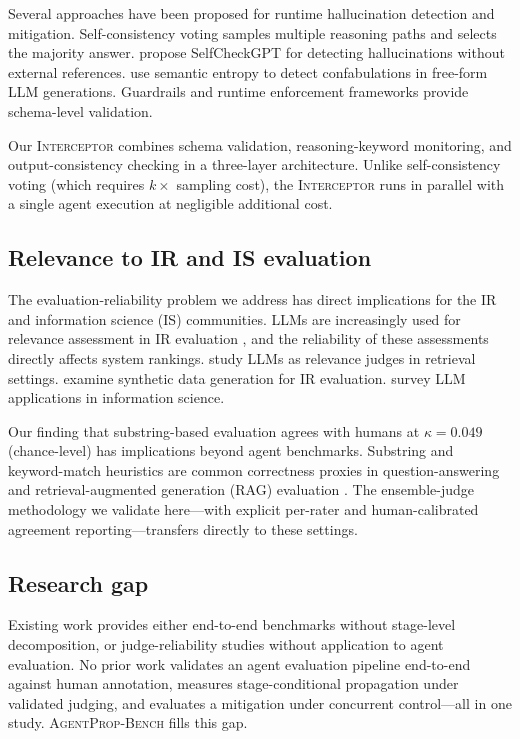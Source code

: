 \documentclass[11pt]{article}
\newcommand{\bench}{\textsc{AgentProp-Bench}\xspace}
\newcommand{\interceptor}{\textsc{Interceptor}\xspace}
\begin{document}
Several approaches have been proposed for runtime hallucination
detection and mitigation.
Self-consistency voting \citep{wang2023selfconsistency} samples multiple
reasoning paths and selects the majority answer.
\citet{manakul2023selfcheckgpt} propose SelfCheckGPT for detecting
hallucinations without external references.
\citet{farquhar2024semantic} use semantic entropy to detect
confabulations in free-form LLM generations.
Guardrails and runtime enforcement frameworks
\citep{wang2026agentspec} provide schema-level validation.

Our \interceptor{} combines schema validation, reasoning-keyword
monitoring, and output-consistency checking in a three-layer architecture.
Unlike self-consistency voting (which requires $k\times$ sampling cost),
the \interceptor{} runs in parallel with a single agent execution at
negligible additional cost.

\subsection{Relevance to IR and IS evaluation}

The evaluation-reliability problem we address has direct implications
for the IR and information science (IS) communities.
LLMs are increasingly used for relevance assessment in IR evaluation
\citep{balog2025rankers}, and the reliability of these
assessments directly affects system rankings.
\citet{salemi2024retrieval} study LLMs as relevance judges in retrieval
settings.
\citet{rahmani2024synthetic} examine synthetic data generation for IR
evaluation.
\citet{zhu2024llmir} survey LLM applications in information science.

Our finding that substring-based evaluation agrees with humans at
$\kappa{=}0.049$ (chance-level) has implications beyond agent
benchmarks.
Substring and keyword-match heuristics are common correctness proxies in
question-answering and retrieval-augmented generation (RAG) evaluation
\citep{es2024ragas,niu2024ragtruth}.
The ensemble-judge methodology we validate here---with explicit
per-rater and human-calibrated agreement reporting---transfers directly
to these settings.

\subsection{Research gap}

Existing work provides either end-to-end benchmarks without stage-level
decomposition, or judge-reliability studies without application to agent
evaluation.
No prior work validates an agent evaluation pipeline end-to-end against
human annotation, measures stage-conditional propagation under validated
judging, and evaluates a mitigation under concurrent control---all in
one study.
\bench{} fills this gap.
\end{document}
